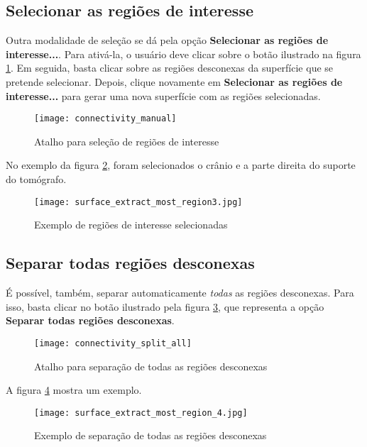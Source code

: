 \newpage

\subsection{Selecionar as regiões de interesse}

Outra modalidade de seleção se dá pela opção \textbf{Selecionar as regiões de interesse...}.
Para ativá-la, o usuário deve clicar sobre o botão ilustrado na figura
\ref{fig:short_connectivity_manual}. Em seguida, basta clicar sobre as regiões desconexas
da superfície que se pretende selecionar. Depois, clique novamente em \textbf{Selecionar as regiões de interesse...}
para gerar uma nova superfície com as regiões selecionadas.

\begin{figure}[!htb]
\centering
\texttt{[image: connectivity\_manual]}
\caption{Atalho para seleção de regiões de interesse}
\label{fig:short_connectivity_manual}
\end{figure}

No exemplo da figura \ref{fig:extract_most_region3}, foram selecionados o crânio e a parte
direita do suporte do tomógrafo.

\begin{figure}[!htb]
\centering
\texttt{[image: surface\_extract\_most\_region3.jpg]}
\caption{Exemplo de regiões de interesse selecionadas}
\label{fig:extract_most_region3}
\end{figure}


\subsection{Separar todas regiões desconexas}

É possível, também, separar automaticamente \textit{todas} as regiões desconexas. Para
isso, basta clicar no botão ilustrado pela figura \ref{fig:connectivity_split_all}, que
representa a opção \textbf{Separar todas regiões desconexas}.

\begin{figure}[!htb]
\centering
\texttt{[image: connectivity\_split\_all]}
\caption{Atalho para separação de todas as regiões desconexas}
\label{fig:connectivity_split_all}
\end{figure}

A figura \ref{fig:extrac_most_region_4} mostra um exemplo.

\begin{figure}[!htb]
\centering
\texttt{[image: surface\_extract\_most\_region\_4.jpg]}
\caption{Exemplo de separação de todas as regiões desconexas}
\label{fig:extrac_most_region_4}
\end{figure}

